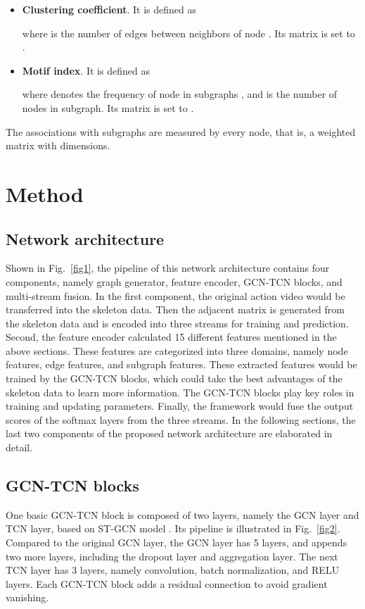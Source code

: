 \documentclass[journal]{IEEEtran}
\begin{document}
\begin{itemize}

    \item \textbf{Clustering coefficient}. It is defined as
        
        where  is the number of edges between neighbors of node . Its matrix is set to .
    \item \textbf{Motif index}. It is defined as
        
        where  denotes the frequency of node  in subgraphs , and  is the number of nodes in subgraph. Its matrix is set to .
\end{itemize}

The associations with subgraphs are measured by every node, that is, a weighted matrix with  dimensions.

\section{Method}

\subsection{Network architecture}

Shown in Fig.~\ref{fig1}, the pipeline of this network architecture contains four components, namely graph generator, feature encoder, GCN-TCN blocks, and multi-stream fusion. In the first component, the original action video would be transferred into the skeleton data. Then the adjacent matrix is generated from the skeleton data and is encoded into three streams for training and prediction. Second, the feature encoder calculated 15 different features mentioned in the above sections. These features are categorized into three domains, namely node features, edge features, and subgraph features. These extracted features would be trained by the GCN-TCN blocks, which could take the best advantages of the skeleton data to learn more information. The GCN-TCN blocks play key roles in training and updating parameters. Finally, the framework would fuse the output scores of the softmax layers from the three streams. In the following sections, the last two components of the proposed network architecture are elaborated in detail.

\subsection{GCN-TCN blocks}

One basic GCN-TCN block is composed of two layers, namely the GCN layer and TCN layer, based on ST-GCN model \cite{yan2018spatial}. Its pipeline is illustrated in Fig.~\ref{fig2}. Compared to the original GCN layer, the GCN layer has 5 layers, and appends two more layers, including the dropout layer and aggregation layer. The next TCN layer has 3 layers, namely convolution, batch normalization, and RELU layers. Each GCN-TCN block adds a residual connection to avoid gradient vanishing.
\end{document}
